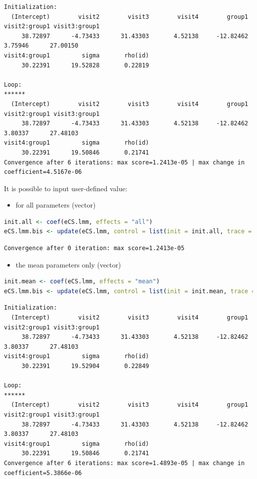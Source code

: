 \documentclass[12pt]{article}
\begin{document}
\label{}
\begin{verbatim}
Initialization:
  (Intercept)        visit2        visit3        visit4        group1 visit2:group1 visit3:group1 
     38.72897      -4.73433      31.43303       4.52138     -12.82462       3.75946      27.00150 
visit4:group1         sigma       rho(id) 
     30.22391      19.52828       0.22819 

Loop:
******
  (Intercept)        visit2        visit3        visit4        group1 visit2:group1 visit3:group1 
     38.72897      -4.73433      31.43303       4.52138     -12.82462       3.80337      27.48103 
visit4:group1         sigma       rho(id) 
     30.22391      19.50846       0.21741 
Convergence after 6 iterations: max score=1.2413e-05 | max change in coefficient=4.5167e-06
\end{verbatim}

It is possible to input user-defined value:
\begin{itemize}
\item for all parameters (vector)
\end{itemize}
\begin{lstlisting}[language=r,numbers=none]
init.all <- coef(eCS.lmm, effects = "all")
eCS.lmm.bis <- update(eCS.lmm, control = list(init = init.all, trace = 1))
\end{lstlisting}

\label{}
\begin{verbatim}
Convergence after 0 iteration: max score=1.2413e-05
\end{verbatim}


\begin{itemize}
\item the mean parameters only (vector)
\end{itemize}
\begin{lstlisting}[language=r,numbers=none]
init.mean <- coef(eCS.lmm, effects = "mean")
eCS.lmm.bis <- update(eCS.lmm, control = list(init = init.mean, trace = 2))
\end{lstlisting}

\label{}
\begin{verbatim}
Initialization:
  (Intercept)        visit2        visit3        visit4        group1 visit2:group1 visit3:group1 
     38.72897      -4.73433      31.43303       4.52138     -12.82462       3.80337      27.48103 
visit4:group1         sigma       rho(id) 
     30.22391      19.52904       0.22849 

Loop:
******
  (Intercept)        visit2        visit3        visit4        group1 visit2:group1 visit3:group1 
     38.72897      -4.73433      31.43303       4.52138     -12.82462       3.80337      27.48103 
visit4:group1         sigma       rho(id) 
     30.22391      19.50846       0.21741 
Convergence after 6 iterations: max score=1.4893e-05 | max change in coefficient=5.3866e-06
\end{verbatim}
\end{document}
